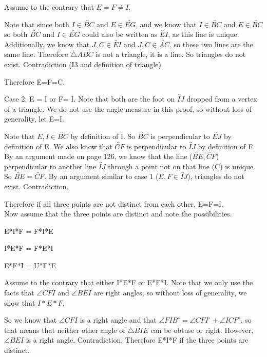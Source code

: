 \documentclass[12pt,letterpaper]{article}
\begin{document}
Assume to the contrary that $E=F \neq I$.

Note that since  both $I \in \overleftrightarrow{BC}$ and $E\in \overleftrightarrow{EG}$, and we know that $I\in \overleftrightarrow{BC}$ and $E\in \overleftrightarrow{BC}$ so both $\overleftrightarrow{BC}$ and $I\in \overleftrightarrow{EG}$ could also be written as $\overleftrightarrow{EI}$, as this line is unique.  Additionally, we know that $J,C \in \overleftrightarrow{EI}$ and $J,C \in \overleftrightarrow{AC}$, so these two lines are the same line.  Therefore $\triangle ABC$ is not a triangle, it is a line. So triangles do not exist. Contradiction (I3 and definition of triangle).

Therefore E=F=C.


Case 2: E = I or F= I.  Note that both are the foot on $\overleftrightarrow{IJ}$ dropped from a vertex of a triangle.  We do not use the angle measure in this proof, so without loss of generality, let E=I.

Note that $E,I\in \overleftrightarrow{BC}$ by definition of I. So $\overleftrightarrow{BC}$ is perpendicular to $\overleftrightarrow{EJ}$ by definition of E.  We also know that $\overleftrightarrow{CF}$ is perpendicular to $\overleftrightarrow{IJ}$ by definition of F.  By an argument made on page 126, we know that the line ($\overleftrightarrow{BE},\overleftrightarrow{CF}$) perpendicular to another line $\overleftrightarrow{IJ}$ through a point not on that line (C) is unique.  So $\overleftrightarrow{BE}=\overleftrightarrow{CF}$.  By an argument similar to case 1 ($E,F\in \overleftrightarrow{IJ}$), triangles do not exist. Contradiction.


Therefore if all three points are not distinct from each other, E=F=I.\\

Now assume that the three points are distinct and note the possibilities.

E*I*F = F*I*E

I*E*F = F*E*I

E*F*I = U*F*E

Assume to the contrary that either I*E*F or E*F*I.  Note that we only use the facts that $\angle CFI$ and $\angle BEI$ are right angles, so without loss of generality, we show that $I*E*F $.

So we know that $\angle CFI$ is a right angle and that $\angle FIB^\circ = \angle CFI^\circ + \angle ICF^\circ$, so that means that neither other angle of $\triangle BIE$ can be obtuse or right.  However, $\angle BEI$ is a right angle.  Contradiction.  Therefore E*I*F if the three points are distinct. 
\end{document}
